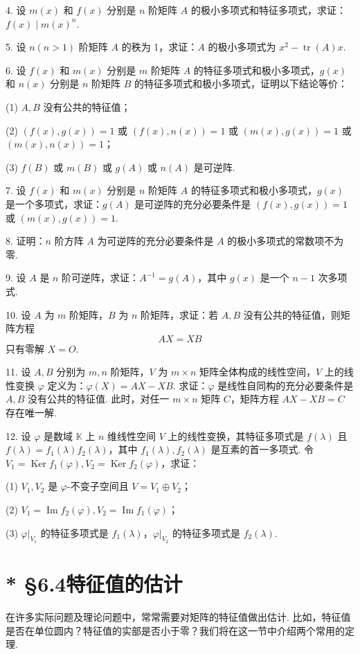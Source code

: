\documentclass[UTF8,12pt,a4paper,fontset=fandol]{ctexart}
\begin{document}
4. 设 $m(x)$ 和 $f(x)$ 分别是 $n$ 阶矩阵 $A$ 的极小多项式和特征多项式，求证：$f(x)\mid m(x)^n$.

5. 设 $n(n>1)$ 阶矩阵 $A$ 的秩为 1，求证：$A$ 的极小多项式为 $x^2-\operatorname{tr}(A)x$.

6. 设 $f(x)$ 和 $m(x)$ 分别是 $m$ 阶矩阵 $A$ 的特征多项式和极小多项式，$g(x)$ 和 $n(x)$ 分别是 $n$ 阶矩阵 $B$ 的特征多项式和极小多项式，证明以下结论等价：

(1) $A,B$ 没有公共的特征值；

(2) $(f(x),g(x))=1$ 或 $(f(x),n(x))=1$ 或 $(m(x),g(x))=1$ 或 $(m(x),n(x))=1$；

(3) $f(B)$ 或 $m(B)$ 或 $g(A)$ 或 $n(A)$ 是可逆阵.

7. 设 $f(x)$ 和 $m(x)$ 分别是 $n$ 阶矩阵 $A$ 的特征多项式和极小多项式，$g(x)$ 是一个多项式，求证：$g(A)$ 是可逆阵的充分必要条件是 $(f(x),g(x))=1$ 或 $(m(x),g(x))=1$.

8. 证明：$n$ 阶方阵 $A$ 为可逆阵的充分必要条件是 $A$ 的极小多项式的常数项不为零.

9. 设 $A$ 是 $n$ 阶可逆阵，求证：$A^{-1}=g(A)$，其中 $g(x)$ 是一个 $n-1$ 次多项式.

10. 设 $A$ 为 $m$ 阶矩阵，$B$ 为 $n$ 阶矩阵，求证：若 $A,B$ 没有公共的特征值，则矩阵方程
\[
AX=XB
\]
只有零解 $X=O$.

11. 设 $A,B$ 分别为 $m,n$ 阶矩阵，$V$ 为 $m\times n$ 矩阵全体构成的线性空间，$V$ 上的线性变换 $\varphi$ 定义为：$\varphi(X)=AX-XB$. 求证：$\varphi$ 是线性自同构的充分必要条件是 $A,B$ 没有公共的特征值. 此时，对任一 $m\times n$ 矩阵 $C$，矩阵方程 $AX-XB=C$ 存在唯一解.

12. 设 $\varphi$ 是数域 $\mathbb{K}$ 上 $n$ 维线性空间 $V$ 上的线性变换，其特征多项式是 $f(\lambda)$ 且 $f(\lambda)=f_1(\lambda)f_2(\lambda)$，其中 $f_1(\lambda),f_2(\lambda)$ 是互素的首一多项式. 令 $V_1=\operatorname{Ker}f_1(\varphi),V_2=\operatorname{Ker}f_2(\varphi)$，求证：

(1) $V_1,V_2$ 是 $\varphi$-不变子空间且 $V=V_1\oplus V_2$；

(2) $V_1=\operatorname{Im}f_2(\varphi),V_2=\operatorname{Im}f_1(\varphi)$；

(3) $\varphi|_{V_1}$ 的特征多项式是 $f_1(\lambda)$，$\varphi|_{V_2}$ 的特征多项式是 $f_2(\lambda)$.

\section*{* §6.4\quad 特征值的估计}

在许多实际问题及理论问题中，常常需要对矩阵的特征值做出估计. 比如，特征值是否在单位圆内？特征值的实部是否小于零？我们将在这一节中介绍两个常用的定理.
\end{document}
